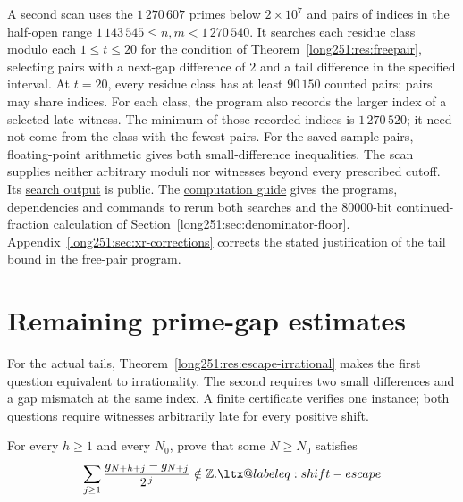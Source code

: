 \documentclass[11pt]{article}
\makeatletter
\newcommand{\compatlabel}[1]{\ltx@label{#1}}
\makeatother
\begin{document}
A second scan uses the $1\,270\,607$ primes below $2\times10^{7}$ and
pairs of indices in the half-open range
$1\,143\,545\le n,m<1\,270\,540$.  It searches each residue class modulo
each $1\le t\le20$ for the condition of
Theorem~\ref{long251:res:freepair}, selecting pairs with a next-gap difference of $2$ and a tail difference
in the specified interval.  At $t=20$, every residue
class has at least $90\,150$ counted pairs; pairs may share indices.
For each class, the program also records the larger index of a selected
late witness.  The minimum of those recorded indices is $1\,270\,520$;
it need not come from the class with the fewest pairs.  For the saved sample pairs, floating-point arithmetic gives both
small-difference inequalities.  The scan supplies neither arbitrary
moduli nor witnesses beyond every prescribed cutoff.  Its
\href{https://github.com/wcook04/plectis-erdos/blob/dd6cc708f650f061de06594eba6ba43878f4de31/research/experiments/erdos251/receipts/free-pair.json}{search output}
is public.
The \href{https://github.com/wcook04/plectis-erdos/blob/dd6cc708f650f061de06594eba6ba43878f4de31/research/experiments/erdos251/README.md}{computation guide}
gives the programs, dependencies and commands to rerun both searches and
the $80000$-bit continued-fraction calculation of
Section~\ref{long251:sec:denominator-floor}.
Appendix~\ref{long251:sec:xr-corrections} corrects the stated
justification of the tail bound in the free-pair program.

\section{Remaining prime-gap estimates}\label{long251:sec:open}

For the actual tails, Theorem~\ref{long251:res:escape-irrational} makes
the first question equivalent to irrationality.  The second requires
two small differences and a gap mismatch at the same index.  A finite
certificate verifies one instance; both questions require witnesses
arbitrarily late for every positive shift.

\begin{problem}\label{long251:prob:escape}\compatlabel{prob:escape}
For every $h\ge1$ and every $N_0$, prove that some $N\ge N_0$ satisfies
\begin{equation}
 \sum_{j\ge1}\frac{g_{N+h+j}-g_{N+j}}{2^{\,j}}\notin\Z .
\label{long251:eq:shift-escape}\compatlabel{eq:shift-escape}
\end{equation}
\end{problem}
\end{document}
